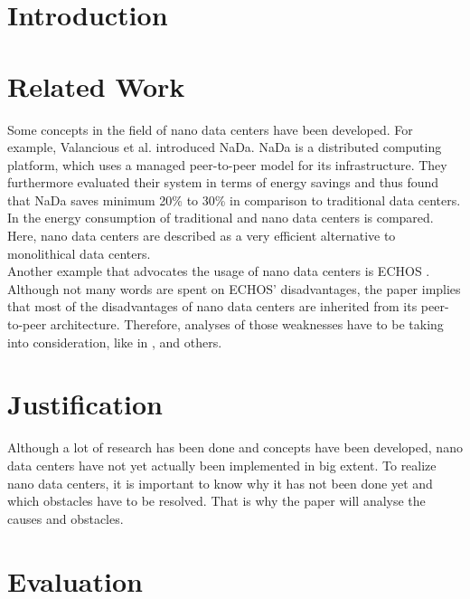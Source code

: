 \documentclass[sigchi-a, authorversion]{acmart}
\begin{document}
\section{Introduction} %

\section{Related Work} %
Some concepts in the field of nano data centers have been developed. For example, Valancious et al. \cite{DBLP:conf/conext/ValanciusLMDR09} introduced NaDa. NaDa is a distributed computing platform, which uses a managed peer-to-peer model for its infrastructure. They furthermore evaluated their system in terms of energy savings and thus found that NaDa saves minimum 20\% to 30\% in comparison to traditional data centers. \\
In \cite{DBLP:journals/sigmetrics/JalaliAVHAT14} the energy consumption of traditional and nano data centers is compared. Here, nano data centers are described as a very efficient alternative to monolithical data centers.\\
Another example that advocates the usage of nano data centers is ECHOS \cite{Laoutaris:2008:EEC:1341431.1341442}. Although not many words are spent on ECHOS' disadvantages, the paper implies that most of the disadvantages of nano data centers are inherited from its peer-to-peer architecture. Therefore, analyses of those weaknesses have to be taking into consideration, like in \cite{Dumitriu:2005:DoS}, \cite{Mhapasekar:2011:anonymity} and others.
\\

\section{Justification} %
Although a lot of research has been done and concepts have been developed, nano data centers have not yet actually been implemented in big extent. To realize nano data centers, it is important to know why it has not been done yet and which obstacles have to be resolved. That is why the paper will analyse the causes and obstacles.

\section{Evaluation} %
\end{document}
